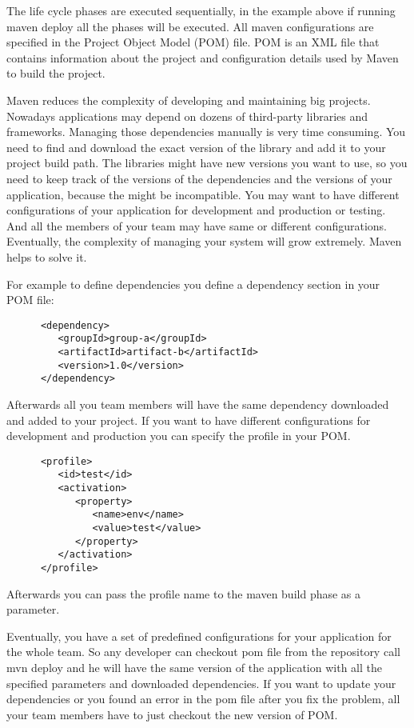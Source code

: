   The life cycle phases are executed sequentially, in the example above if
  running maven deploy all the phases will be executed. All maven configurations are specified in the Project Object Model (POM) file.
  POM is an XML file that contains information about the project and configuration details used by Maven 
  to build the project. 

  Maven reduces the complexity of developing and maintaining big projects.
  Nowadays applications may depend on dozens of third-party libraries and
  frameworks. Managing those dependencies manually is very time consuming. You
  need to find and download the exact version of the library and add it to your project build path.
  The libraries might have new versions you want to use, so you need to keep track of the versions
  of the dependencies and the versions of your application, because the might be incompatible. 
  You may want to have different configurations of your application for development and production or testing.
  And all the members of your team may have same or different configurations.
  Eventually, the complexity of managing your system will grow extremely. Maven helps to solve it.

  For example to define dependencies you define a dependency section in your POM file:
  \lstset{language=XML}
    \begin{lstlisting}
      <dependency>
         <groupId>group-a</groupId>
         <artifactId>artifact-b</artifactId>
         <version>1.0</version>
      </dependency>
    \end{lstlisting}  

  Afterwards all you team members will have the same dependency downloaded and
  added to your project. If you want to have different configurations for
  development and production you can specify the profile in your POM.
   \lstset{language=XML}
    \begin{lstlisting}
      <profile>
         <id>test</id>
         <activation>
            <property>
               <name>env</name>
               <value>test</value>
            </property>
         </activation>
      </profile>
    \end{lstlisting}
  Afterwards you can pass the profile name to the maven build phase as
  a parameter.

  Eventually, you have a set of predefined configurations for your application
  for the whole team. So any developer can checkout pom file from the repository
  call mvn deploy and he will have the same version of the application with all
  the specified parameters and downloaded dependencies. If you want to update
  your dependencies or you found an error in the pom file after you fix the
  problem, all your team members have to just checkout the new version of POM.
 

